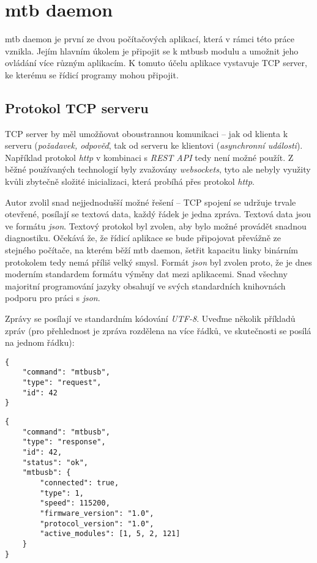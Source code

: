 \section{\gls{mtb} daemon}

\gls{mtb} daemon je první ze dvou počítačových aplikací, která v rámci této
práce vznikla. Jejím hlavním úkolem je připojit se k \gls{mtbusb} modulu
a umožnit jeho ovládání více různým aplikacím. K tomuto účelu aplikace vystavuje
TCP server, ke kterému se řídicí programy mohou připojit.

\subsection{Protokol TCP serveru} \label{sec:daemon:proto}

TCP server by měl umožňovat oboustrannou komunikaci – jak od klienta k serveru
(\textit{požadavek, odpověď}, tak od serveru ke klientovi (\textit{asynchronní
události}). Například protokol \textit{http} v kombinaci s \textit{REST API}
tedy není možné použít. Z běžné používaných technologií byly zvažovány
\textit{websockets}, tyto ale nebyly využity kvůli zbytečně složité inicializaci,
která probíhá přes protokol \textit{http}.

Autor zvolil snad nejjednodušší možné řešení – TCP spojení se udržuje trvale
otevřené, posílají se textová data, každý řádek je jedna zpráva. Textová data
jsou ve formátu \textit{json}. Textový protokol byl zvolen, aby bylo možné
provádět snadnou diagnostiku. Očekává že, že řídicí aplikace se bude připojovat
převážně ze stejného počítače, na kterém běží \gls{mtb} daemon, šetřit kapacitu
linky binárním protokolem tedy nemá příliš velký smysl. Formát \textit{json}
byl zvolen proto, že je dnes moderním standardem formátu výměny dat mezi
aplikacemi. Snad všechny majoritní programování jazyky obsahují ve svých
standardních knihovnách podporu pro práci s \textit{json}.

Zprávy se posílají ve standardním kódování \textit{UTF-8}. Uveďme několik
příkladů zpráv (pro přehlednost je zpráva rozdělena na více řádků, ve skutečnosti
se posílá na jednom řádku):

\begin{verbatim}
{
    "command": "mtbusb",
    "type": "request",
    "id": 42
}
\end{verbatim}

\begin{verbatim}
{
    "command": "mtbusb",
    "type": "response",
    "id": 42,
    "status": "ok",
    "mtbusb": {
        "connected": true,
        "type": 1,
        "speed": 115200,
        "firmware_version": "1.0",
        "protocol_version": "1.0",
        "active_modules": [1, 5, 2, 121]
    }
}
\end{verbatim}

